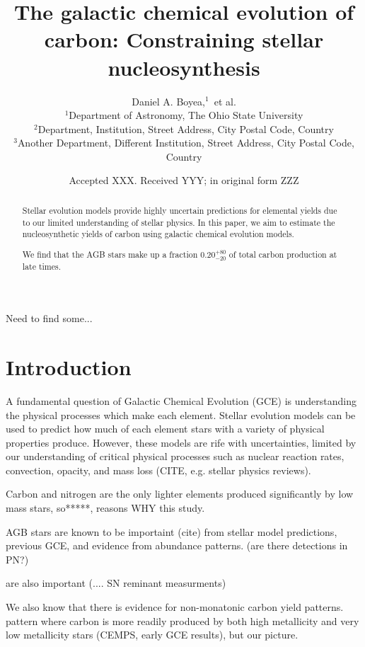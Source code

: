 \documentclass[fleqn,usenatbib]{mnras}
\title[Constraining carbon yields]{The galactic chemical evolution of carbon: Constraining stellar nucleosynthesis}
\author[D. A. Boyea et al.]{
Daniel A. Boyea,$^{1}$\
et al.
\\
$^{1}$Department of Astronomy, The Ohio State University\\
$^{2}$Department, Institution, Street Address, City Postal Code, Country\\
$^{3}$Another Department, Different Institution, Street Address, City Postal Code, Country
}
\date{Accepted XXX. Received YYY; in original form ZZZ}
\begin{document}
\label{firstpage}
\pagerange{\pageref{firstpage}--\pageref{lastpage}}
\maketitle

\begin{abstract}
Stellar evolution models provide highly uncertain predictions for elemental yields due to our limited understanding of stellar physics. In this paper, we aim to estimate the nucleosynthetic yields of carbon using galactic chemical evolution models. 

We find that the AGB stars make up a fraction $0.20_{-20}^{+80}$ of total carbon production at late times. 
\end{abstract}

\begin{keywords}
Need to find some...
\end{keywords}



\section{Introduction}



A fundamental question of Galactic Chemical Evolution (GCE) is understanding the physical processes which make each element. Stellar evolution models can be used to predict how much of each element stars with a variety of physical properties produce. However, these models are rife with uncertainties, limited by our understanding of critical physical processes such as nuclear reaction rates, convection, opacity, and mass loss (CITE, e.g. stellar physics reviews). 

Carbon and nitrogen are the only lighter elements produced significantly by low mass stars, so*****, reasons WHY this study. 

AGB stars are known to be importaint (cite) from stellar model predictions, previous GCE, and evidence from abundance patterns. (are there detections in PN?)

\CC are also important (.... SN reminant measurments)

We also know that there is evidence for non-monatonic carbon yield patterns. 
pattern where carbon is more readily produced by both high metallicity and very low metallicity stars (CEMPS, early GCE results), but our picture.
\end{document}
